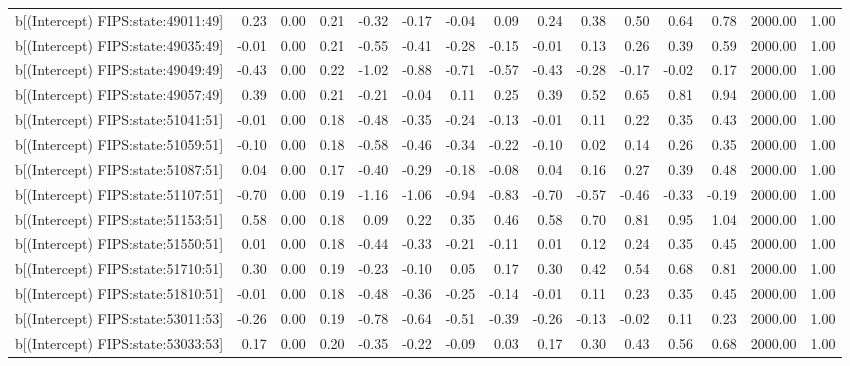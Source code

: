 \begin{table}[ht]
\begin{tabular}{rrrrrrrrrrrrrrr}
  b[(Intercept) FIPS:state:49011:49] & 0.23 & 0.00 & 0.21 & -0.32 & -0.17 & -0.04 & 0.09 & 0.24 & 0.38 & 0.50 & 0.64 & 0.78 & 2000.00 & 1.00 \\ 
  b[(Intercept) FIPS:state:49035:49] & -0.01 & 0.00 & 0.21 & -0.55 & -0.41 & -0.28 & -0.15 & -0.01 & 0.13 & 0.26 & 0.39 & 0.59 & 2000.00 & 1.00 \\ 
  b[(Intercept) FIPS:state:49049:49] & -0.43 & 0.00 & 0.22 & -1.02 & -0.88 & -0.71 & -0.57 & -0.43 & -0.28 & -0.17 & -0.02 & 0.17 & 2000.00 & 1.00 \\ 
  b[(Intercept) FIPS:state:49057:49] & 0.39 & 0.00 & 0.21 & -0.21 & -0.04 & 0.11 & 0.25 & 0.39 & 0.52 & 0.65 & 0.81 & 0.94 & 2000.00 & 1.00 \\ 
  b[(Intercept) FIPS:state:51041:51] & -0.01 & 0.00 & 0.18 & -0.48 & -0.35 & -0.24 & -0.13 & -0.01 & 0.11 & 0.22 & 0.35 & 0.43 & 2000.00 & 1.00 \\ 
  b[(Intercept) FIPS:state:51059:51] & -0.10 & 0.00 & 0.18 & -0.58 & -0.46 & -0.34 & -0.22 & -0.10 & 0.02 & 0.14 & 0.26 & 0.35 & 2000.00 & 1.00 \\ 
  b[(Intercept) FIPS:state:51087:51] & 0.04 & 0.00 & 0.17 & -0.40 & -0.29 & -0.18 & -0.08 & 0.04 & 0.16 & 0.27 & 0.39 & 0.48 & 2000.00 & 1.00 \\ 
  b[(Intercept) FIPS:state:51107:51] & -0.70 & 0.00 & 0.19 & -1.16 & -1.06 & -0.94 & -0.83 & -0.70 & -0.57 & -0.46 & -0.33 & -0.19 & 2000.00 & 1.00 \\ 
  b[(Intercept) FIPS:state:51153:51] & 0.58 & 0.00 & 0.18 & 0.09 & 0.22 & 0.35 & 0.46 & 0.58 & 0.70 & 0.81 & 0.95 & 1.04 & 2000.00 & 1.00 \\ 
  b[(Intercept) FIPS:state:51550:51] & 0.01 & 0.00 & 0.18 & -0.44 & -0.33 & -0.21 & -0.11 & 0.01 & 0.12 & 0.24 & 0.35 & 0.45 & 2000.00 & 1.00 \\ 
  b[(Intercept) FIPS:state:51710:51] & 0.30 & 0.00 & 0.19 & -0.23 & -0.10 & 0.05 & 0.17 & 0.30 & 0.42 & 0.54 & 0.68 & 0.81 & 2000.00 & 1.00 \\ 
  b[(Intercept) FIPS:state:51810:51] & -0.01 & 0.00 & 0.18 & -0.48 & -0.36 & -0.25 & -0.14 & -0.01 & 0.11 & 0.23 & 0.35 & 0.45 & 2000.00 & 1.00 \\ 
  b[(Intercept) FIPS:state:53011:53] & -0.26 & 0.00 & 0.19 & -0.78 & -0.64 & -0.51 & -0.39 & -0.26 & -0.13 & -0.02 & 0.11 & 0.23 & 2000.00 & 1.00 \\ 
  b[(Intercept) FIPS:state:53033:53] & 0.17 & 0.00 & 0.20 & -0.35 & -0.22 & -0.09 & 0.03 & 0.17 & 0.30 & 0.43 & 0.56 & 0.68 & 2000.00 & 1.00 \\ 

\end{tabular}
\end{table}
